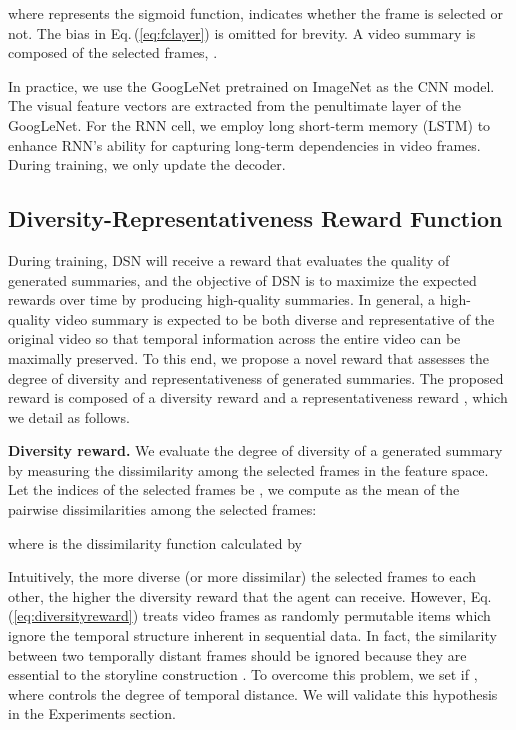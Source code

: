 \documentclass[letterpaper]{article} \usepackage{aaai18}  \usepackage{times}  \usepackage{helvet}  \usepackage{courier}  \usepackage{url}  \usepackage{graphicx}
\begin{document}
where  represents the sigmoid function,  indicates whether the  frame is selected or not. The bias in Eq.\,(\ref{eq:fclayer}) is omitted for brevity. A video summary is composed of the selected frames, .

In practice, we use the GoogLeNet \cite{szegedy2015going} pretrained on ImageNet \cite{deng2009imagenet} as the CNN model. The visual feature vectors  are extracted from the penultimate layer of the GoogLeNet. For the RNN cell, we employ long short-term memory (LSTM) to enhance RNN's ability for capturing long-term dependencies in video frames. During training, we only update the decoder.

\subsection{Diversity-Representativeness Reward Function}
During training, DSN will receive a reward  that evaluates the quality of generated summaries, and the objective of DSN is to maximize the expected rewards over time by producing high-quality summaries. In general, a high-quality video summary is expected to be both diverse and representative of the original video so that temporal information across the entire video can be maximally preserved. To this end, we propose a novel reward that assesses the degree of diversity and representativeness of generated summaries. The proposed reward is composed of a diversity reward  and a representativeness reward , which we detail as follows.

{\bf Diversity reward.} We evaluate the degree of diversity of a generated summary by measuring the dissimilarity among the selected frames in the feature space. Let the indices of the selected frames be , we compute  as the mean of the pairwise dissimilarities among the selected frames:

where  is the dissimilarity function calculated by


Intuitively, the more diverse (or more dissimilar) the selected frames to each other, the higher the diversity reward that the agent can receive. However, Eq.\,(\ref{eq:diversityreward}) treats video frames as randomly permutable items which ignore the temporal structure inherent in sequential data. In fact, the similarity between two temporally distant frames should be ignored because they are essential to the storyline construction \cite{gong2014diverse}. To overcome this problem, we set  if , where  controls the degree of temporal distance. We will validate this hypothesis in the Experiments section.
\end{document}
